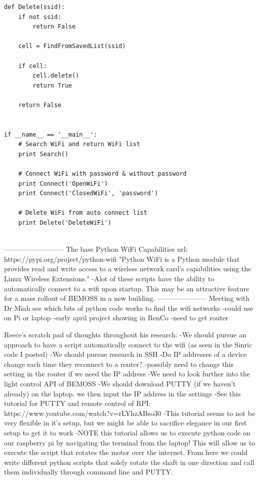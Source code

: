 \documentclass[fontsize=11pt, %
                             paper=letter, %
                             twoside, %
                             captions=tableheading,
                             index=totoc,
                             hyperref]{labbook}
\begin{document}
\begin{verbatim}
def Delete(ssid):
    if not ssid:
        return False

    cell = FindFromSavedList(ssid)

    if cell:
        cell.delete()
        return True

    return False


if __name__ == '__main__':
    # Search WiFi and return WiFi list
    print Search()

    # Connect WiFi with password & without password
    print Connect('OpenWiFi')
    print Connect('ClosedWiFi', 'password')

    # Delete WiFi from auto connect list
    print Delete('DeleteWiFi')
    
    \end{verbatim}
    --------------------------
    The base Python WiFi Capabilities url: https://pypi.org/project/python-wifi
    "Python WiFi is a Python module that provides read and write access to a wireless network card’s capabilities using the Linux Wireless Extensions."
    -Alot of these scripts have the ability to automatically connect to a wifi upon startup. This may be an attractive feature for a mass rollout of BEMOSS in a new building. 
    ---------------------
    Meeting with Dr Miah 
    see which bits of python code works to find the wifi networks 
        -could use on Pi or laptop 
        -early april project showing in RenCo 
        -need to get router
        
        
        
Reece's scratch pad of thoughts throughout his research:
-We should pursue an approach to have a script automatically connect to the wifi (as seen in the Sinric code I posted) 
-We should pursue research in SSH
-Do IP addresses of a device change each time they reconnect to a router? 
    -possibly need to change this setting in the router if we need the IP address 
-We need to look further into the light control API of BEMOSS
-We should download PUTTY (if we haven't already) on the laptop. we then input the IP address in the settings 
-See this tutorial for PUTTY and remote control of RPI: https://www.youtube.com/watch?v=rLYhzABso30
-This tutorial seems to not be very flexible in it's setup, but we might be able to sacrifice elegance in our first setup to get it to work 
-NOTE this tutorial allows us to execute python code on our raspberry pi by navigating the terminal from the laptop! This will allow us to execute the script that rotates the motor over the internet. From here we could write different python scripts that solely rotate the shaft in one direction and call them individually through command line and PUTTY. 
\end{document}
